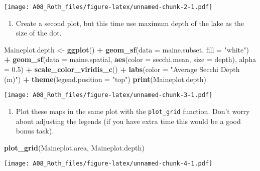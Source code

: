 \documentclass[]{article}
\newenvironment{Shaded}{\begin{snugshade}}{\end{snugshade}}
\newcommand{\DataTypeTok}[1]{\textcolor[rgb]{0.13,0.29,0.53}{#1}}
\newcommand{\FloatTok}[1]{\textcolor[rgb]{0.00,0.00,0.81}{#1}}
\newcommand{\KeywordTok}[1]{\textcolor[rgb]{0.13,0.29,0.53}{\textbf{#1}}}
\newcommand{\NormalTok}[1]{#1}
\newcommand{\OperatorTok}[1]{\textcolor[rgb]{0.81,0.36,0.00}{\textbf{#1}}}
\newcommand{\StringTok}[1]{\textcolor[rgb]{0.31,0.60,0.02}{#1}}
\providecommand{\tightlist}{%
  \setlength{\itemsep}{0pt}\setlength{\parskip}{0pt}}
\begin{document}
\texttt{[image: A08\_Roth\_files/figure-latex/unnamed-chunk-2-1.pdf]}

\begin{enumerate}
\def\labelenumi{\arabic{enumi}.}
\setcounter{enumi}{6}
\tightlist
\item
  Create a second plot, but this time use maximum depth of the lake as
  the size of the dot.
\end{enumerate}

\begin{Shaded}
\begin{Highlighting}[]
\NormalTok{Maineplot.depth <-}\StringTok{ }\KeywordTok{ggplot}\NormalTok{() }\OperatorTok{+}
\StringTok{  }\KeywordTok{geom_sf}\NormalTok{(}\DataTypeTok{data =}\NormalTok{ maine.subset, }\DataTypeTok{fill =} \StringTok{"white"}\NormalTok{) }\OperatorTok{+}
\StringTok{  }\KeywordTok{geom_sf}\NormalTok{(}\DataTypeTok{data =}\NormalTok{ maine.spatial, }\KeywordTok{aes}\NormalTok{(}\DataTypeTok{color =}\NormalTok{ secchi.mean, }\DataTypeTok{size =}\NormalTok{ depth), }
          \DataTypeTok{alpha =} \FloatTok{0.5}\NormalTok{) }\OperatorTok{+}
\StringTok{  }\KeywordTok{scale_color_viridis_c}\NormalTok{() }\OperatorTok{+}
\StringTok{  }\KeywordTok{labs}\NormalTok{(}\DataTypeTok{color =} \StringTok{"Average Secchi Depth (m)"}\NormalTok{) }\OperatorTok{+}
\StringTok{  }\KeywordTok{theme}\NormalTok{(}\DataTypeTok{legend.position =} \StringTok{"top"}\NormalTok{)}
\KeywordTok{print}\NormalTok{(Maineplot.depth)}
\end{Highlighting}
\end{Shaded}

\texttt{[image: A08\_Roth\_files/figure-latex/unnamed-chunk-3-1.pdf]}

\begin{enumerate}
\def\labelenumi{\arabic{enumi}.}
\setcounter{enumi}{7}
\tightlist
\item
  Plot these maps in the same plot with the \texttt{plot\_grid}
  function. Don't worry about adjusting the legends (if you have extra
  time this would be a good bonus task).
\end{enumerate}

\begin{Shaded}
\begin{Highlighting}[]
\KeywordTok{plot_grid}\NormalTok{(Maineplot.area, Maineplot.depth)}
\end{Highlighting}
\end{Shaded}

\texttt{[image: A08\_Roth\_files/figure-latex/unnamed-chunk-4-1.pdf]}
\end{document}
